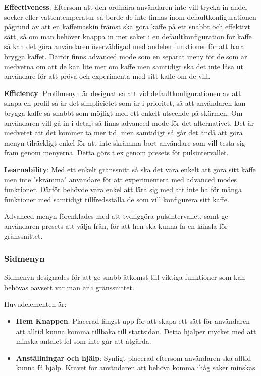 \textbf{Effectiveness}: Eftersom att den ordinära användaren inte vill trycka in andel socker eller vattentemperatur så borde de inte finnas inom defaultkonfigurationen pågrund av att en kaffemaskin främst ska göra kaffe på ett snabbt och effektivt sätt, så om man behöver knappa in mer saker i en defaultkonfiguration för kaffe så kan det göra användaren överväldigad med andelen funktioner för att bara brygga kaffet. Därför finns advanced mode som en separat meny för de som är medvetna om att de kan lite mer om kaffe men samtidigt ska det inte låsa ut användare för att pröva och experimenta med sitt kaffe om de vill.

\textbf{Efficiency}: Profilmenyn är designat så att vid defaultkonfigurationen av att skapa en profil så är det simplicietet som är i prioritet, så att användaren kan brygga kaffe så snabbt som möjligt med ett enkelt utseende på skärmen. Om användaren vill gå in i detalj så finns advanced mode för det alternativet. Det är medvetet att det kommer ta mer tid, men samtidigt så går det ändå att göra menyn tilräckligt enkel för att inte skrämma bort användare som vill testa sig fram genom menyerna. Detta görs t.ex genom presets för pulsintervallet.

\textbf{Learnability}: Med ett enkelt gränssnitt så ska det vara enkelt att göra sitt kaffe men inte "skrämma" användare för att experimentera med advanced modes funktioner. Därför behövde vara enkel att lära sig med att inte ha för många funktioner med samtidigt tillfredsställa de som vill konfigurera sitt kaffe.

Advanced menyn förenklades med att tydliggöra pulsintervallet, samt ge användaren presets att välja från, för att hen ska kunna få en känsla för gränssnittet.


\subsubsection{Sidmenyn}
Sidmenyn designades för att ge snabb åtkomst till viktiga funktioner som kan behövas oavsett var man är i gränssnittet.  

Huvudelementen är:
\begin{itemize}
    \item \textbf{Hem Knappen}: Placerad längst upp för att skapa ett sätt för användaren att alltid kunna komma tillbaka till startsidan. Detta hjälper mycket med att minska antalet fel som inte går att åtgärda. 
    \item \textbf{Anställningar och hjälp}: Synligt placerad eftersom användaren ska alltid kunna få hjälp. Kravet för användaren att behöva komma ihåg saker minskas.
\end{itemize}


